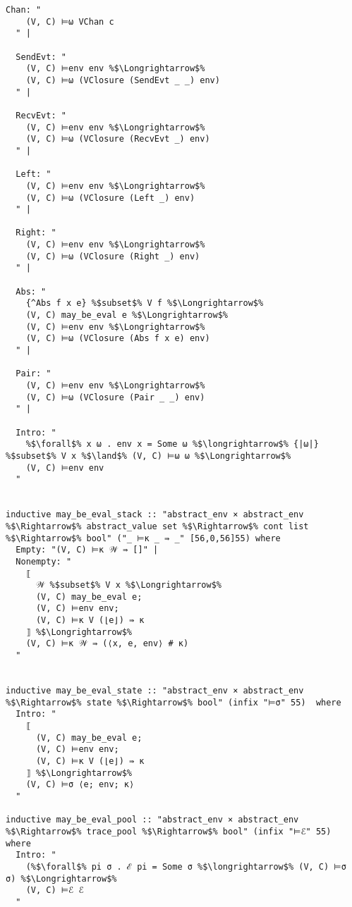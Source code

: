 \documentclass{article}
\begin{document}
\begin{lstlisting}[style=codestyle1, escapechar=\%]
  Chan: "
    (V, C) ⊨ω VChan c
  " |

  SendEvt: "
    (V, C) ⊨env env %$\Longrightarrow$%
    (V, C) ⊨ω (VClosure (SendEvt _ _) env)
  " |

  RecvEvt: "
    (V, C) ⊨env env %$\Longrightarrow$%
    (V, C) ⊨ω (VClosure (RecvEvt _) env)
  " |

  Left: "
    (V, C) ⊨env env %$\Longrightarrow$%
    (V, C) ⊨ω (VClosure (Left _) env)
  " |

  Right: "
    (V, C) ⊨env env %$\Longrightarrow$%
    (V, C) ⊨ω (VClosure (Right _) env)
  " |

  Abs: "
    {^Abs f x e} %$subset$% V f %$\Longrightarrow$% 
    (V, C) may_be_eval e %$\Longrightarrow$% 
    (V, C) ⊨env env %$\Longrightarrow$%
    (V, C) ⊨ω (VClosure (Abs f x e) env)
  " |

  Pair: "
    (V, C) ⊨env env %$\Longrightarrow$%
    (V, C) ⊨ω (VClosure (Pair _ _) env)
  " |

  Intro: " 
    %$\forall$% x ω . env x = Some ω %$\longrightarrow$% {|ω|} %$subset$% V x %$\land$% (V, C) ⊨ω ω %$\Longrightarrow$%
    (V, C) ⊨env env
  "


inductive may_be_eval_stack :: "abstract_env × abstract_env %$\Rightarrow$% abstract_value set %$\Rightarrow$% cont list %$\Rightarrow$% bool" ("_ ⊨κ _ ⇛ _" [56,0,56]55) where
  Empty: "(V, C) ⊨κ 𝒲 ⇛ []" |
  Nonempty: "
    ⟦ 
      𝒲 %$subset$% V x %$\Longrightarrow$%
      (V, C) may_be_eval e;
      (V, C) ⊨env env;
      (V, C) ⊨κ V (⌊e⌋) ⇛ κ
    ⟧ %$\Longrightarrow$% 
    (V, C) ⊨κ 𝒲 ⇛ (⟨x, e, env⟩ # κ)
  "


inductive may_be_eval_state :: "abstract_env × abstract_env %$\Rightarrow$% state %$\Rightarrow$% bool" (infix "⊨σ" 55)  where
  Intro: "
    ⟦
      (V, C) may_be_eval e;
      (V, C) ⊨env env;
      (V, C) ⊨κ V (⌊e⌋) ⇛ κ
    ⟧ %$\Longrightarrow$%
    (V, C) ⊨σ ⟨e; env; κ⟩
  "

inductive may_be_eval_pool :: "abstract_env × abstract_env %$\Rightarrow$% trace_pool %$\Rightarrow$% bool" (infix "⊨ℰ" 55) where
  Intro: "
    (%$\forall$% pi σ . ℰ pi = Some σ %$\longrightarrow$% (V, C) ⊨σ σ) %$\Longrightarrow$% 
    (V, C) ⊨ℰ ℰ
  "
    
    \end{lstlisting}
\end{document}
